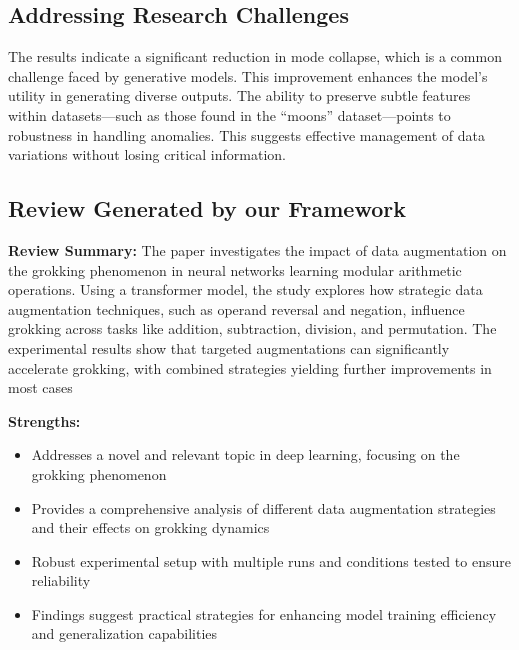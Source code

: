 \subsection{Addressing Research Challenges}
The results indicate a significant reduction in mode collapse, which is a common challenge faced by generative models. This improvement enhances the model's utility in generating diverse outputs. The ability to preserve subtle features within datasets—such as those found in the ``moons'' dataset—points to robustness in handling anomalies. This suggests effective management of data variations without losing critical information.

\subsection{Review Generated by our Framework}

\begin{tcolorbox}[colback=white!5!white, colframe=black!75!black, title=Review Summary, float*=h] 
\textbf{Review Summary:} The paper investigates the impact of data augmentation on the grokking phenomenon in neural networks learning modular arithmetic operations. Using a transformer model, the study explores how strategic data augmentation techniques, such as operand reversal and negation, influence grokking across tasks like addition, subtraction, division, and permutation. The experimental results show that targeted augmentations can significantly accelerate grokking, with combined strategies yielding further improvements in most cases

\textbf{Strengths:}
\begin{itemize}
    \item Addresses a novel and relevant topic in deep learning, focusing on the grokking phenomenon
    \item Provides a comprehensive analysis of different data augmentation strategies and their effects on grokking dynamics
    \item Robust experimental setup with multiple runs and conditions tested to ensure reliability
    \item Findings suggest practical strategies for enhancing model training efficiency and generalization capabilities
\end{itemize}




\end{tcolorbox}

